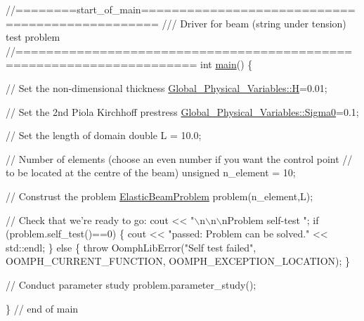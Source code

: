  
\begin{DoxyCodeInclude}
\textcolor{comment}{//========start\_of\_main================================================}
\textcolor{comment}{/// Driver for beam (string under tension) test problem }
\textcolor{comment}{}\textcolor{comment}{//=====================================================================}
\textcolor{keywordtype}{int} \hyperlink{tensioned__string_8cc_ae66f6b31b5ad750f1fe042a706a4e3d4}{main}()
\{

 \textcolor{comment}{// Set the non-dimensional thickness }
 \hyperlink{namespaceGlobal__Physical__Variables_af6e07423e22c0991084d9a2f43727805}{Global\_Physical\_Variables::H}=0.01; 
 
 \textcolor{comment}{// Set the 2nd Piola Kirchhoff prestress}
 \hyperlink{namespaceGlobal__Physical__Variables_a417dc688a70c4f06ef0faed047068ba2}{Global\_Physical\_Variables::Sigma0}=0.1; 
 
 \textcolor{comment}{// Set the length of domain}
 \textcolor{keywordtype}{double} L = 10.0;

 \textcolor{comment}{// Number of elements (choose an even number if you want the control point }
 \textcolor{comment}{// to be located at the centre of the beam)}
 \textcolor{keywordtype}{unsigned} n\_element = 10;

 \textcolor{comment}{// Construst the problem}
 \hyperlink{classElasticBeamProblem}{ElasticBeamProblem} problem(n\_element,L);

 \textcolor{comment}{// Check that we're ready to go:}
 cout << \textcolor{stringliteral}{"\(\backslash\)n\(\backslash\)n\(\backslash\)nProblem self-test "};
 \textcolor{keywordflow}{if} (problem.self\_test()==0) 
  \{
   cout << \textcolor{stringliteral}{"passed: Problem can be solved."} << std::endl;
  \}
 \textcolor{keywordflow}{else} 
  \{
   \textcolor{keywordflow}{throw} OomphLibError(\textcolor{stringliteral}{"Self test failed"},
                       OOMPH\_CURRENT\_FUNCTION,
                       OOMPH\_EXCEPTION\_LOCATION);
  \}

 \textcolor{comment}{// Conduct parameter study}
 problem.parameter\_study();

\} \textcolor{comment}{// end of main}

\end{DoxyCodeInclude}




 

